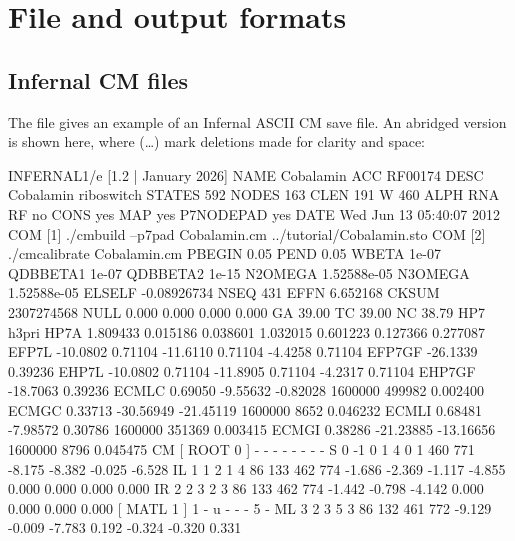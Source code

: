 \section{File and output formats}
\label{section:formats}
\setcounter{footnote}{0}

\subsection{Infernal CM files}

The file  gives an example of an Infernal ASCII
CM save file. An abridged version is shown here, where (\ldots) mark
deletions made for clarity and space:

\begin{tinysreoutput}
INFERNAL1/e [1.2 | January 2026]
NAME     Cobalamin
ACC      RF00174
DESC     Cobalamin riboswitch
STATES   592
NODES    163
CLEN     191
W        460
ALPH     RNA
RF       no
CONS     yes
MAP      yes
P7NODEPAD yes
DATE     Wed Jun 13 05:40:07 2012
COM      [1] ./cmbuild --p7pad Cobalamin.cm ../tutorial/Cobalamin.sto
COM      [2] ./cmcalibrate Cobalamin.cm
PBEGIN   0.05
PEND     0.05
WBETA    1e-07
QDBBETA1 1e-07
QDBBETA2 1e-15
N2OMEGA  1.52588e-05
N3OMEGA  1.52588e-05
ELSELF   -0.08926734
NSEQ     431
EFFN     6.652168
CKSUM    2307274568
NULL     0.000  0.000  0.000  0.000 
GA       39.00
TC       39.00
NC       38.79
HP7      h3pri
HP7A     1.809433 0.015186 0.038601 1.032015 0.601223 0.127366 0.277087
EFP7L    -10.0802 0.71104 -11.6110 0.71104 -4.4258 0.71104
EFP7GF   -26.1339 0.39236
EHP7L    -10.0802 0.71104 -11.8905 0.71104 -4.2317 0.71104
EHP7GF   -18.7063 0.39236
ECMLC    0.69050    -9.55632    -0.82028     1600000      499982  0.002400
ECMGC    0.33713   -30.56949   -21.45119     1600000        8652  0.046232
ECMLI    0.68481    -7.98572     0.30786     1600000      351369  0.003415
ECMGI    0.38286   -21.23885   -13.16656     1600000        8796  0.045475
CM
                                             [ ROOT    0 ]      -      - - - - -    -    -
     S     0    -1 0     1     4     0     1   460   771  -8.175  -8.382  -0.025  -6.528
    IL     1     1 2     1     4    86   133   462   774  -1.686  -2.369  -1.117  -4.855                  0.000  0.000  0.000  0.000
    IR     2     2 3     2     3    86   133   462   774  -1.442  -0.798  -4.142                          0.000  0.000  0.000  0.000
                                             [ MATL    1 ]      1      - u - - -    5    -
    ML     3     2 3     5     3    86   132   461   772  -9.129  -0.009  -7.783                          0.192 -0.324 -0.320  0.331

\end{tinysreoutput}
